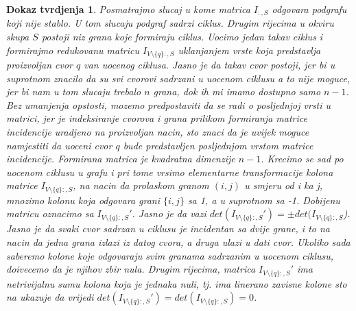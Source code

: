 \documentclass[11pt]{article}
\newtheorem*{custom_proof}{Dokaz tvrdjenja}
\begin{document}
\begin{custom_proof}
		Posmatrajmo slucaj u kome matrica $I_{:,S}$ odgovara podgrafu koji nije stablo. U tom slucaju podgraf sadrzi ciklus. Drugim rijecima u okviru skupa $S$ postoji niz grana koje formiraju ciklus.
		Uocimo jedan takav ciklus i formirajmo redukovanu matricu $I_{V \setminus \{q\}:,S}$ uklanjanjem vrste koja predstavlja proizvoljan cvor $q$ van uocenog ciklusa.
	       Jasno je da takav cvor postoji, jer bi u suprotnom znacilo da su svi cvorovi sadrzani u uocenom ciklusu a to nije moguce, jer bi nam u tom slucaju trebalo $n$ grana, dok ih mi imamo dostupno samo $n-1$. 
		Bez umanjenja opstosti, mozemo predpostaviti da se radi o posljednjoj vrsti u matrici, jer je indeksiranje cvorova i grana prilikom formiranja matrice incidencije uradjeno na proizvoljan nacin, 
		sto znaci da je uvijek moguce namjestiti da uoceni cvor $q$ bude predstavljen posljednjom vrstom matrice incidencije. 
	       Formirana matrica je kvadratna dimenzije $n -1$. Krecimo se sad po uocenom ciklusu u grafu i pri tome vrsimo elementarne transformacije kolona matrice $I_{V \setminus \{q\}:,S}$,
	       na nacin da prolaskom granom $(i,j)$ u smjeru od i ka j, mnozimo kolonu koja odgovara grani $\{i,j\}$ sa 1, a u suprotnom sa -1. Dobijenu matricu oznacimo sa $I_{V \setminus \{q\}:,S}'$.
	       Jasno je da vazi $det(I_{V \setminus \{q\}:,S}') = \pm det(I_{V \setminus \{q\}:,S}$). Jasno je da svaki cvor sadrzan u ciklusu je incidentan sa dvije grane,
		i to na nacin da jedna grana izlazi iz datog cvora, a druga ulazi u dati cvor. Ukoliko sada saberemo kolone koje odgovaraju svim granama sadrzanim u uocenom ciklusu, doivecemo da je njihov zbir nula. 
		Drugim rijecima, matrica $I_{V \setminus \{q\}:,S}'$ ima netrivijalnu sumu kolona koja je jednaka nuli, tj. ima linerano zavisne kolone sto na ukazuje da vrijedi
		$det(I_{V \setminus \{q\}:,S}') = det(I_{V \setminus \{q\}:,S}) = 0$.
	

\end{custom_proof}
\end{document}

